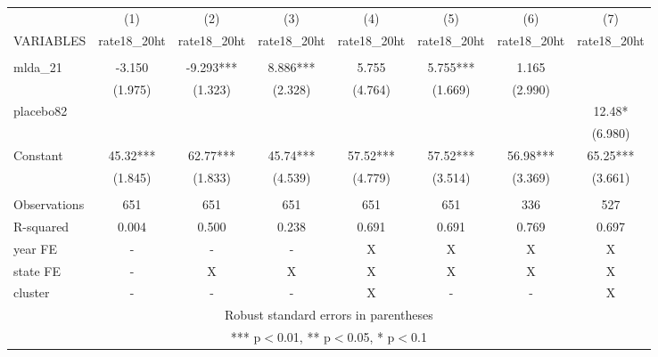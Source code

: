 \documentclass[]{article}
\begin{document}
\begin{tabular}{lccccccc} \hline
 & (1) & (2) & (3) & (4) & (5) & (6) & (7) \\
VARIABLES & rate18\_20ht & rate18\_20ht & rate18\_20ht & rate18\_20ht & rate18\_20ht & rate18\_20ht & rate18\_20ht \\ \hline
 &  &  &  &  &  &  &  \\
mlda\_21 & -3.150 & -9.293*** & 8.886*** & 5.755 & 5.755*** & 1.165 &  \\
 & (1.975) & (1.323) & (2.328) & (4.764) & (1.669) & (2.990) &  \\
placebo82 &  &  &  &  &  &  & 12.48* \\
 &  &  &  &  &  &  & (6.980) \\
Constant & 45.32*** & 62.77*** & 45.74*** & 57.52*** & 57.52*** & 56.98*** & 65.25*** \\
 & (1.845) & (1.833) & (4.539) & (4.779) & (3.514) & (3.369) & (3.661) \\
 &  &  &  &  &  &  &  \\
Observations & 651 & 651 & 651 & 651 & 651 & 336 & 527 \\
R-squared & 0.004 & 0.500 & 0.238 & 0.691 & 0.691 & 0.769 & 0.697 \\
year FE & - & - & - & X & X & X & X \\
state FE & - & X & X & X & X & X & X \\
 cluster & - & - & - & X & - & - & X \\ \hline
\multicolumn{8}{c}{ Robust standard errors in parentheses} \\
\multicolumn{8}{c}{ *** p$<$0.01, ** p$<$0.05, * p$<$0.1} \\
\end{tabular}
\end{document}
